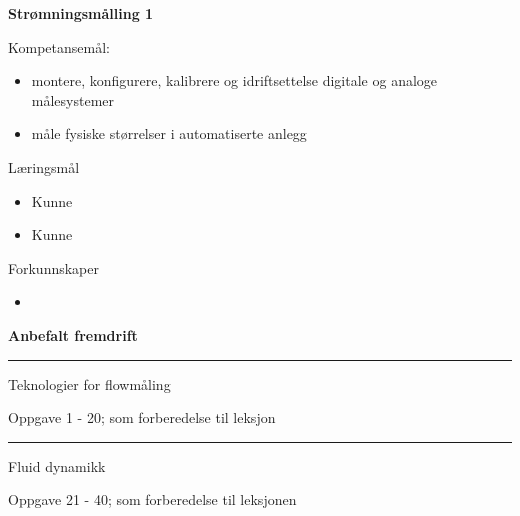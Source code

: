 \centerline{\bf Strømningsmålling 1}  \bigskip

Kompetansemål:
\begin{itemize}[noitemsep]

	\item montere, konfigurere, kalibrere og idriftsettelse digitale og analoge målesystemer
	\item måle fysiske størrelser i automatiserte anlegg
\end{itemize}
	Læringsmål
	\begin{itemize}[noitemsep]
		\item Kunne 
		\item Kunne 
	\end{itemize}

	Forkunnskaper

	\begin{itemize}[noitemsep]
		\item 

	\end{itemize}
\vfil \eject
\centerline{\bf Anbefalt fremdrift} 

\vskip 5pt

\filbreak
\hrule \vskip 5pt
\noindent {}

\vskip 5pt


\vskip 2pt  Teknologier for flowmåling

\vskip 2pt \noindent Oppgave 1 - 20;  som forberedelse til leksjon %

\vskip 10pt



\filbreak
\hrule \vskip 5pt
\noindent {}

\vskip 5pt


\vskip 2pt  Fluid dynamikk

\vskip 2pt \noindent Oppgave 21 - 40;  som forberedelse til leksjonen%

